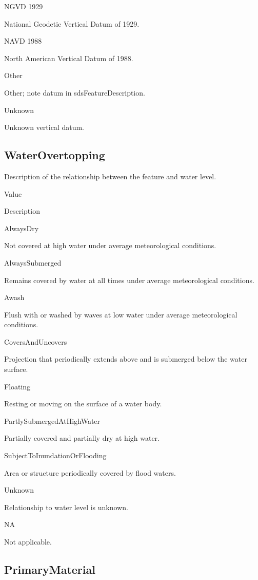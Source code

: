 \documentclass[
  letterpaper,
  DIV=11,
  numbers=noendperiod]{scrreprt}
\begin{document}
NGVD 1929

National Geodetic Vertical Datum of 1929.

NAVD 1988

North American Vertical Datum of 1988.

Other

Other; note datum in sdsFeatureDescription.

Unknown

Unknown vertical datum.

\subsection{WaterOvertopping}\label{waterovertopping-1}

Description of the relationship between the feature and water level.

Value

Description

AlwaysDry

Not covered at high water under average meteorological conditions.

AlwaysSubmerged

Remains covered by water at all times under average meteorological
conditions.

Awash

Flush with or washed by waves at low water under average meteorological
conditions.

CoversAndUncovers

Projection that periodically extends above and is submerged below the
water surface.

Floating

Resting or moving on the surface of a water body.

PartlySubmergedAtHighWater

Partially covered and partially dry at high water.

SubjectToInundationOrFlooding

Area or structure periodically covered by flood waters.

Unknown

Relationship to water level is unknown.

NA

Not applicable.

\subsection{PrimaryMaterial}\label{primarymaterial-1}
\end{document}
